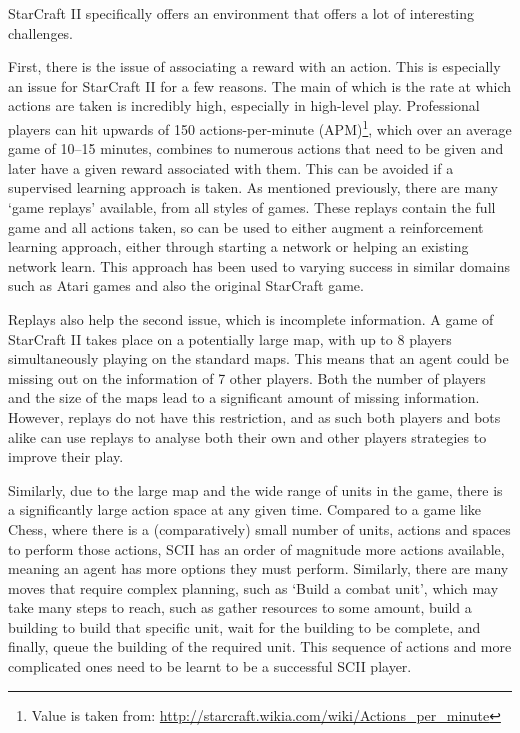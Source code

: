 StarCraft II specifically offers an environment that offers a lot of interesting
challenges.

First, there is the issue of associating a reward with an action. This is
especially an issue for StarCraft II for a few reasons. The main of which is
the rate at which actions are taken is incredibly high, especially in high-level
play. Professional players can hit upwards of 150 actions-per-minute
(APM)\footnote{Value is taken from:
\url{http://starcraft.wikia.com/wiki/Actions_per_minute}}, which over an average
game of 10--15 minutes, combines to numerous actions that need to be given and
later have a given reward associated with them. This can be avoided if a supervised
learning approach is taken. As mentioned previously, there are many `game
replays' available, from all styles of games. These replays contain the full
game and all actions taken, so can be used to either augment a reinforcement
learning approach, either through starting a network or helping an existing
network learn. This approach has been used to varying success in similar domains
such as Atari games\cite{hester2018deep} and also the original StarCraft
game\cite{justesen2017learning}.

Replays also help the second issue, which is incomplete information.
A game of StarCraft II takes place on a potentially large map, with up to 8
players simultaneously playing on the standard maps. This means that an agent
could be missing out on the information of 7 other players. Both the number of
players and the size of the maps lead to a significant amount of missing information.
However, replays do not have this restriction, and as such both players and bots
alike can use replays to analyse both their own and other players strategies to
improve their play.

Similarly, due to the large map and the wide range of units in the game, there
is a significantly large action space at any given time. Compared to a game like
Chess, where there is a (comparatively) small number of units, actions and
spaces to perform those actions, SCII has an order of magnitude more actions
available, meaning an agent has more options they must perform. Similarly, there
are many moves that require complex planning, such as `Build a
combat unit', which may take many steps to reach, such as gather
resources to some amount, build a building to build that specific unit, wait for
the building to be complete, and finally, queue the building of the required
unit. This sequence of actions and more complicated ones need to be learnt to
be a successful SCII player.

